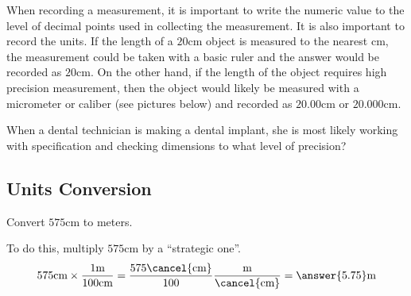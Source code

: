 \documentclass{ximera}
\begin{document}
\begin{question}\label{q:equalLength}
When recording a measurement, it is important to write the numeric value to the level of decimal points used in collecting the measurement. It is also important to record the units.  If the length of a $20$cm object is measured to the nearest cm, the measurement could be taken with a basic ruler and the answer would be recorded as $20$cm.  On the other hand, if the length of the object requires high precision measurement, then the object would likely be measured with a micrometer or caliber (see pictures below) and recorded as $20.00$cm or $20.000$cm.

\begin{center}
      \end{center}

When a dental technician is making a dental implant, she is most likely working with specification and checking dimensions to what level of precision?
\begin{multipleChoice} 
\end{multipleChoice} 
\end{question}

\subsection*{Units Conversion}

 \begin{example}\label{ex:unitConversion}
     Convert $575$cm to meters. 
     \begin{explanation}
     To do this, multiply $575$cm by a “strategic one”.  
$$575\text{cm}\times \frac{1\text{m}}{100\text{cm}}=\frac{575\cancel{\text{cm}}}{100}\frac{\text{m}}{\cancel{\text{cm}}}=\answer{5.75}\text{m}$$
     \end{explanation}
 \end{example}
\end{document}
